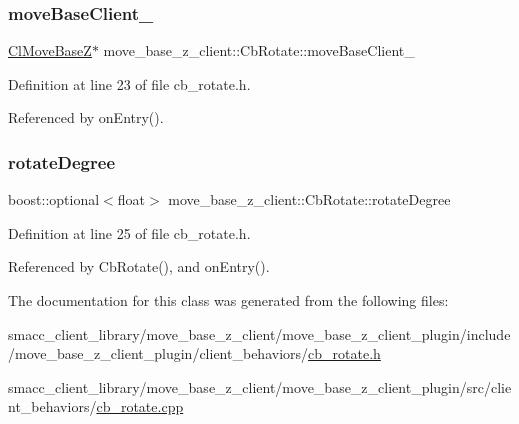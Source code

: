 \subsubsection{\texorpdfstring{move\+Base\+Client\+\_\+}{moveBaseClient\_}}
{\footnotesize\ttfamily \hyperlink{classmove__base__z__client_1_1ClMoveBaseZ}{Cl\+Move\+BaseZ}$\ast$ move\+\_\+base\+\_\+z\+\_\+client\+::\+Cb\+Rotate\+::move\+Base\+Client\+\_\+}



Definition at line 23 of file cb\+\_\+rotate.\+h.



Referenced by on\+Entry().

\mbox{\label{classmove__base__z__client_1_1CbRotate_a30d0f24b857149d78a023635562516b6}} 
\subsubsection{\texorpdfstring{rotate\+Degree}{rotateDegree}}
{\footnotesize\ttfamily boost\+::optional$<$float$>$ move\+\_\+base\+\_\+z\+\_\+client\+::\+Cb\+Rotate\+::rotate\+Degree}



Definition at line 25 of file cb\+\_\+rotate.\+h.



Referenced by Cb\+Rotate(), and on\+Entry().



The documentation for this class was generated from the following files\+:\begin{DoxyCompactItemize}
\item 
smacc\+\_\+client\+\_\+library/move\+\_\+base\+\_\+z\+\_\+client/move\+\_\+base\+\_\+z\+\_\+client\+\_\+plugin/include/move\+\_\+base\+\_\+z\+\_\+client\+\_\+plugin/client\+\_\+behaviors/\hyperlink{cb__rotate_8h}{cb\+\_\+rotate.\+h}\item 
smacc\+\_\+client\+\_\+library/move\+\_\+base\+\_\+z\+\_\+client/move\+\_\+base\+\_\+z\+\_\+client\+\_\+plugin/src/client\+\_\+behaviors/\hyperlink{cb__rotate_8cpp}{cb\+\_\+rotate.\+cpp}\end{DoxyCompactItemize}
